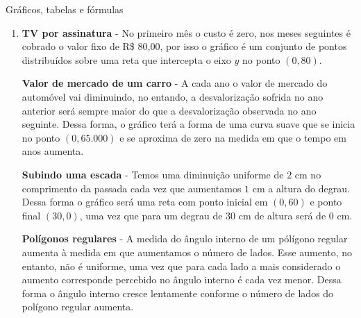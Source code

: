\begin{answer}{Gráficos, tabelas e fórmulas}
{\begin{enumerate}

\clearpage
\textbf{Polígonos regulares}




\item \textbf{TV por assinatura} - No primeiro mês o custo é zero, nos meses seguintes é cobrado o valor fixo de R\$ 80,00, por isso o gráfico é um conjunto de pontos distribuídos sobre uma reta que intercepta o eixo $y$ no ponto $(0,80)$.

\textbf{Valor de mercado de um carro} - A cada ano o valor de mercado do automóvel vai diminuindo, no entando, a desvalorização sofrida no ano anterior será sempre maior do que a desvalorização observada no ano seguinte. Dessa forma, o gráfico terá a forma de uma curva suave que se inicia no ponto $(0,65.000) $ e se aproxima de zero na medida em que o tempo em anos aumenta.

\textbf{Subindo uma escada} - Temos uma diminuição uniforme de $2$ cm no comprimento da passada cada vez que aumentamos $1$ cm a altura do degrau. Dessa forma o gráfico será uma reta com ponto inicial em $(0,60)$ e ponto final $(30,0)$, uma vez que para um degrau de $30$ cm de altura será de $0$ cm.

\textbf{Polígonos regulares} - A medida do ângulo interno de um pólígono regular aumenta à medida em que aumentamos o número de lados. Esse aumento, no entanto, não é uniforme, uma vez que para cada lado a mais considerado o aumento corresponde percebido no ângulo interno é cada vez menor. Dessa forma o ângulo interno cresce lentamente conforme o número de lados do polígono regular aumenta.


\end{enumerate}}
\end{answer}
